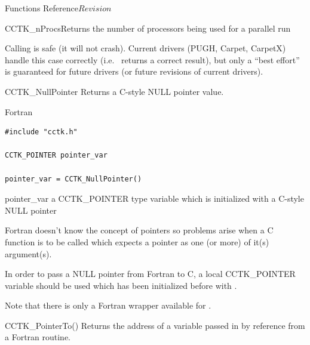 \begin{cactuspart}{ Functions Reference}{}{$Revision$}
\begin{FunctionDescription}{CCTK\_nProcs}{Returns the number of processors being used for a parallel run}
\begin{Discussion}
Calling  is safe (it will not crash).
Current drivers (PUGH, Carpet, CarpetX) handle this case correctly
(i.e.\  returns a correct result), but only
a ``best effort'' is guaranteed for future drivers (or future revisions
of current drivers).
\end{Discussion}
\end{FunctionDescription}


\begin{FunctionDescription}{CCTK\_NullPointer}%
\label{CCTK-NullPointer}
Returns a C-style NULL pointer value.

\begin{SynopsisSection}
\begin{Synopsis}{Fortran}
\begin{verbatim}
#include "cctk.h"

CCTK_POINTER pointer_var

pointer_var = CCTK_NullPointer()
\end{verbatim}
\end{Synopsis}
\end{SynopsisSection}

\begin{ResultSection}
\begin{Result}{pointer\_var}
a CCTK\_POINTER type variable which is initialized with a C-style NULL pointer
\end{Result}
\end{ResultSection}

\begin{Discussion}
Fortran doesn't know the concept of pointers so problems arise when a C function
is to be called which expects a pointer as one (or more) of it(s) argument(s).

In order to pass a NULL pointer from Fortran to C, a local CCTK\_POINTER variable should be used which has been initialized before with .

Note that there is only a Fortran wrapper available for .
\end{Discussion}

\begin{SeeAlsoSection}
\begin{SeeAlso}{CCTK\_PointerTo()}
Returns the address of a variable passed in by reference from a Fortran routine.
\end{SeeAlso}
\end{SeeAlsoSection}


\end{FunctionDescription}
\end{cactuspart}
